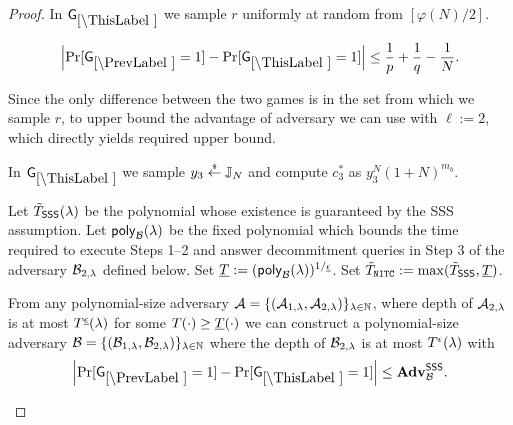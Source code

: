 \begin{proof}
In $\games_\thisgame$ we sample $r$ uniformly at random from $[\varphi(N)/2]$. 

\begin{lemma}
\[
\left|\Pr[\games_\prevgame = 1] - \Pr[\games_\thisgame = 1]\right| \leq \frac{1}{p}+\frac{1}{q}-\frac{1}{N}.
\]
\end{lemma}
Since the only difference between the two games is in the set from which we sample $r$, to upper bound the advantage of adversary we can use  with $\ell:=2$, which directly yields required upper bound.

%


In $\games_\thisgame$ we sample $y_3 \stackrel{{\scriptscriptstyle\$}}{\leftarrow} \mathbb{J}_N$ and compute $c_3^*$ as $y_3^N (1+N)^{m_b}$.

Let $\tilde{T}_\mathsf{SSS}(\lambda)$ be the polynomial whose existence is guaranteed by the SSS assumption.
Let $\mathsf{poly}_{\mathcal{B}}(\lambda)$ be the fixed polynomial which bounds the time required to execute Steps 1--2 and answer decommitment queries in Step 3 of the adversary $\mathcal{B}_{2, \lambda}$ defined below. Set $\underline{T} := (\mathsf{poly}_{\mathcal{B}}(\lambda))^{1 / \underline{\epsilon}}$.  Set $\tilde{T}_{\mathtt{NITC}} := \max(\tilde{T}_\mathsf{SSS}, \underline{T})$.
\begin{lemma}
From any polynomial-size adversary $\mathcal{A} = \{(\mathcal{A}_{1,\lambda}, \mathcal{A}_{2, \lambda})\}_{\lambda \in \mathbb{N}}$, where depth of $\mathcal{A}_{2, \lambda}$ is at most $T^{\underline{\epsilon}}(\lambda)$ for some $T(\cdot) \geq \underline{T}(\cdot)$ we can construct a polynomial-size adversary $\mathcal{B} = \{(\mathcal{B}_{1,\lambda}, \mathcal{B}_{2, \lambda})\}_{\lambda \in \mathbb{N}}$ where the depth of $\mathcal{B}_{2, \lambda}$ is at most $T^{\epsilon}(\lambda)$ with
\[
\left|\Pr[\games_\prevgame = 1] - \Pr[\games_\thisgame = 1]\right| \leq \advtg_\advB^\sss.
\]
\end{lemma}


\end{proof}
